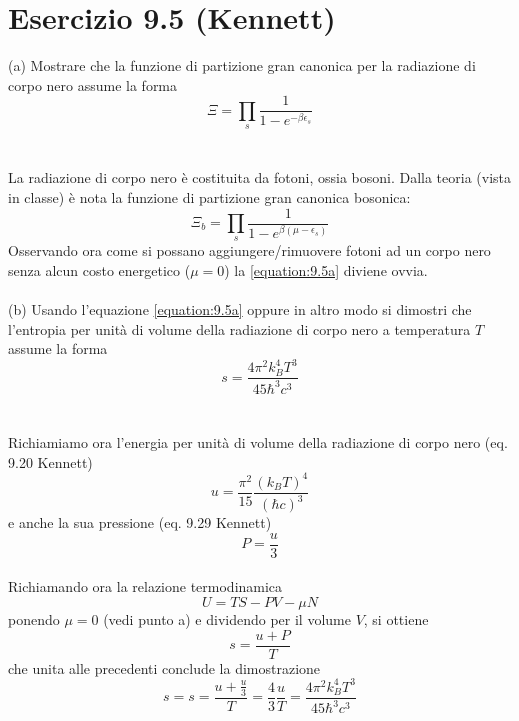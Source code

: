 \documentclass[a4paper]{article}
\begin{document}
    \section*{Esercizio 9.5 (Kennett)}
        (a) Mostrare che la funzione di partizione gran canonica per la radiazione di corpo nero assume la forma
        \begin{equation}
            \Xi=\prod_s\frac{1}{1-e^{-\beta\epsilon_s}}
            \label{equation:9.5a}
        \end{equation}
        \\
        \\
        La radiazione di corpo nero è costituita da fotoni, ossia bosoni.
        Dalla teoria (vista in classe) è nota la funzione di partizione gran canonica bosonica:
        \begin{equation*}
            \Xi_b=\prod_s\frac{1}{1-e^{\beta(\mu-\epsilon_s)}}
        \end{equation*}
        Osservando ora come si possano aggiungere/rimuovere fotoni ad un corpo nero senza alcun costo energetico ($\mu=0$) la \ref{equation:9.5a} diviene ovvia.
        \\
        \\
        (b) Usando l'equazione \ref{equation:9.5a} oppure in altro modo si dimostri che l'entropia per unità di volume della radiazione di corpo nero a temperatura $T$ assume la forma
        \begin{equation}
            s=\frac{4\pi^2k_B^4T^3}{45\hbar^3c^3}
        \end{equation}
        \\
        \\
        Richiamiamo ora l'energia per unità di volume della radiazione di corpo nero (eq. 9.20 Kennett)
        \begin{equation*}
            u=\frac{\pi^2}{15}\frac{(k_BT)^4}{(\hbar c)^3}
        \end{equation*}
        e anche la sua pressione (eq. 9.29 Kennett)
        \begin{equation*}
            P=\frac{u}{3}
        \end{equation*}
        \\
        Richiamando ora la relazione termodinamica
        \begin{equation}
            U=TS-PV-\mu N
        \end{equation}
        ponendo $\mu=0$ (vedi punto a) e dividendo per il volume $V$, si ottiene
        \begin{equation*}
            s=\frac{u+P}{T}
        \end{equation*}
        che unita alle precedenti conclude la dimostrazione
        \begin{equation*}
            s=s=\frac{u+\frac{u}{3}}{T}=\frac{4}{3}\frac{u}{T}=\frac{4\pi^2k_B^4T^3}{45\hbar^3c^3}
        \end{equation*}
\end{document}
